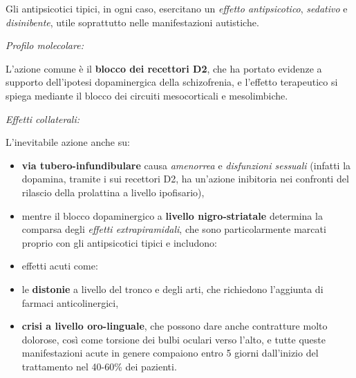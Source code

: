\documentclass[]{article}
\begin{document}
Gli antipsicotici tipici, in ogni caso, esercitano un \emph{effetto
antipsicotico}, \emph{sedativo} e \emph{disinibente}, utile soprattutto
nelle manifestazioni autistiche.

\emph{\emph{Profilo molecolare:}}

L'azione comune è il \textbf{blocco dei recettori D2}, che ha portato
evidenze a supporto dell'ipotesi dopaminergica della schizofrenia, e
l'effetto terapeutico si spiega mediante il blocco dei circuiti
mesocorticali e mesolimbiche.

\emph{\emph{Effetti collaterali:}}

L'inevitabile azione anche su:

\begin{itemize}
\item
  \textbf{via tubero-infundibulare} causa \emph{amenorrea} e
  \emph{disfunzioni sessuali} (infatti la dopamina, tramite i sui
  recettori D2, ha un'azione inibitoria nei confronti del rilascio della
  prolattina a livello ipofisario),
\item
  mentre il blocco dopaminergico a \textbf{livello nigro-striatale}
  determina la comparsa degli \emph{effetti extrapiramidali}, che sono
  particolarmente marcati proprio con gli antipsicotici tipici e
  includono:
\end{itemize}

\begin{itemize}
\item
  effetti acuti come:
\end{itemize}

\begin{itemize}
\item
  le \textbf{distonie} a livello del tronco e degli arti, che richiedono
  l'aggiunta di farmaci anticolinergici,
\item
  \textbf{crisi a livello oro-linguale}, che possono dare anche
  contratture molto dolorose, così come torsione dei bulbi oculari verso
  l'alto, e tutte queste manifestazioni acute in genere compaiono entro
  5 giorni dall'inizio del trattamento nel 40-60\% dei pazienti.
\end{itemize}
\end{document}
